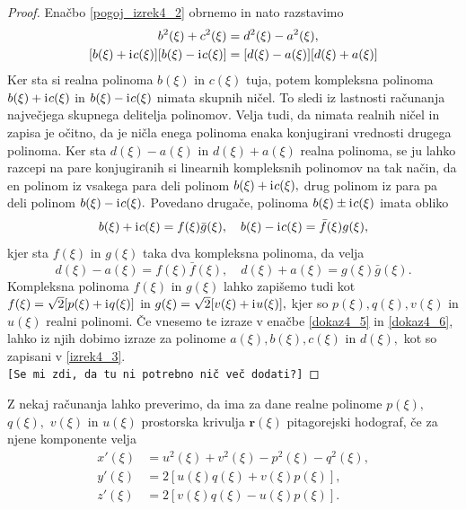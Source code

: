 \documentclass[12pt,a4paper,twoside]{article}
\newcommand{\iu}{\mathrm{i}\mkern1mu} %
\theoremstyle{definition} %
\theoremstyle{plain} %
\numberwithin{equation}{section}  %
\begin{document}
\begin{proof}
	Enačbo \eqref{pogoj_izrek4_2} obrnemo in nato razstavimo
	\begin{align}
		b^2(\xi)+c^2(\xi)&=d^2(\xi)-a^2(\xi), \nonumber \\
		[b(\xi)+\iu c(\xi)][b(\xi)-\iu c(\xi)]&=[d(\xi)-a(\xi)][d(\xi)+a(\xi)] \label{dokaz4_4}
	\end{align}
	Ker sta si realna polinoma $b(\xi)$ in $c(\xi)$ tuja, potem kompleksna polinoma $b(\xi)+\iu c(\xi)$ in $b(\xi)-\iu c(\xi)$ nimata skupnih ničel. To sledi iz lastnosti računanja največjega skupnega delitelja polinomov. Velja tudi, da nimata realnih ničel in zapisa je očitno, da je ničla enega polinoma enaka konjugirani vrednosti drugega polinoma. Ker sta $d(\xi)-a(\xi)$ in $d(\xi)+a(\xi)$ realna polinoma, se ju lahko razcepi na pare konjugiranih si linearnih kompleksnih polinomov na tak način, da en polinom iz vsakega para deli polinom $b(\xi)+\iu c(\xi),$ drug polinom iz para pa deli polinom $b(\xi)-\iu c(\xi).$ Povedano drugače, polinoma $b(\xi) \pm \iu c(\xi)$ imata obliko
	\begin{equation}
	\label{dokaz4_5}
		b(\xi)+ \iu c(\xi)=f(\xi)\bar{g}(\xi), \quad b(\xi)-\iu c(\xi)=\bar{f}(\xi)g(\xi),
	\end{equation}
	kjer sta $f(\xi)$ in $g(\xi)$ taka dva kompleksna polinoma, da velja
	\begin{equation}
		\label{dokaz4_6}
		d(\xi)-a(\xi)=f(\xi)\bar{f}(\xi), \quad d(\xi)+a(\xi)=g(\xi)\bar{g}(\xi).
	\end{equation}
	Kompleksna polinoma $f(\xi)$ in $g(\xi)$ lahko zapišemo tudi kot $f(\xi)=\sqrt{2}[p(\xi)+\iu q(\xi)]$ in $g(\xi)=\sqrt{2}[v(\xi)+\iu u(\xi)],$ kjer so $p(\xi),q(\xi),v(\xi)$ in $u(\xi)$ realni polinomi. Če vnesemo te izraze v enačbe \eqref{dokaz4_5} in \eqref{dokaz4_6}, lahko iz njih dobimo izraze za polinome $a(\xi),b(\xi),c(\xi)$ in $d(\xi),$ kot so zapisani v \eqref{izrek4_3}.\\
\texttt{[Se mi zdi, da tu ni potrebno nič več dodati?]}
\end{proof}

Z nekaj računanja lahko preverimo, da ima za dane realne polinome $p(\xi),$ $q(\xi),$ $v(\xi)$ in $u(\xi)$ prostorska krivulja $\mathbf{r}(\xi)$ pitagorejski hodograf, če za njene komponente velja
\begin{align}
	x'(\xi)&=u^2(\xi)+v^2(\xi)-p^2(\xi)-q^2(\xi), \nonumber \\
	y'(\xi)&=2[u(\xi)q(\xi)+v(\xi)p(\xi)], \nonumber \\
	z'(\xi)&=2[v(\xi)q(\xi)-u(\xi)p(\xi)]. \label{eq4_7}
\end{align}
\end{document}
